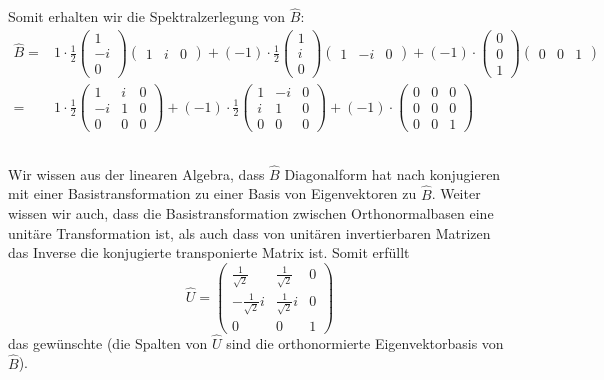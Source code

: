 \documentclass[11pt, ngerman, fleqn, DIV=15, headinclude]{scrartcl}
\begin{document}
Somit erhalten wir die Spektralzerlegung von $\hat{B}$:
\begin{align*}
	\hat{B}=&1\cdot \frac{1}{2}\begin{pmatrix}1\\-i\\0\end{pmatrix} \begin{pmatrix}1&i&0\end{pmatrix}+(-1)\cdot\frac{1}{2}\begin{pmatrix}1\\i\\0\end{pmatrix}\begin{pmatrix}1&-i&0\end{pmatrix}+ (-1)\cdot \begin{pmatrix} 0\\0\\1\end{pmatrix}\begin{pmatrix}0&0&1\end{pmatrix} \\
		=&1\cdot\frac{1}{2}\begin{pmatrix}1&i&0\\-i&1&0\\0&0&0\end{pmatrix} +(-1)\cdot\frac{1}{2}\begin{pmatrix} 1 &- i & 0\\ i & 1 & 0 \\ 0&0&0\end{pmatrix}+ (-1)\cdot\begin{pmatrix}0&0&0\\0&0&0\\0&0&1\end{pmatrix}
\end{align*}

\subsection{}

Wir wissen aus der linearen Algebra, dass $\hat{B}$ Diagonalform hat nach konjugieren mit einer Basistransformation zu einer Basis von Eigenvektoren zu $\hat{B}$. Weiter wissen wir auch, dass die Basistransformation zwischen Orthonormalbasen eine unitäre Transformation ist, als auch dass von unitären invertierbaren Matrizen das Inverse die konjugierte transponierte Matrix ist. Somit erfüllt
\[
\hat{U}=\begin{pmatrix} \frac{1}{\sqrt{2}} & \frac{1}{\sqrt{2}} & 0 \\ -\frac{1}{\sqrt{2}}i & \frac{1}{\sqrt{2}}i & 0 \\ 0 & 0 &1\end{pmatrix}
\]
das gewünschte (die Spalten von $\hat{U}$ sind die orthonormierte Eigenvektorbasis von $\hat{B}$).
\end{document}
